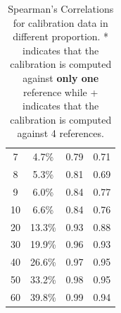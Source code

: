 \documentclass[11pt,letterpaper]{article}
\begin{document}
\begin{table}[h]
\begin{tabular}{cc|cc}
7                                                 & 4.7\%                                      & 0.79                                                                    & 0.71                                                                   \\
8                                                 & 5.3\%                                      & 0.81                                                                    & 0.69                                                                   \\
9                                                 & 6.0\%                                      & 0.84                                                                    & 0.77                                                                   \\
10                                                & 6.6\%                                      & 0.84                                                                    & 0.76                                                                   \\
20                                                & 13.3\%                                     & 0.93                                                                    & 0.88                                                                   \\
30                                                & 19.9\%                                     & 0.96                                                                    & 0.93                                                                   \\
40                                                & 26.6\%                                     & 0.97                                                                    & 0.95                                                                   \\
50                                                & 33.2\%                                     & 0.98                                                                    & 0.95                                                                   \\ 
60                                                & 39.8\%                                     & 0.99                                                                    & 0.94                                                                  \\ \hline
\end{tabular}
\caption{\label{spearmansen} Spearman's Correlations for calibration data in different proportion. * indicates that the calibration is computed against \textbf{only one} reference while + indicates that the calibration is computed against 4 references.}
\end{table}
\end{document}
